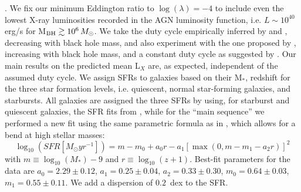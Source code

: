 . We fix our minimum Eddington ratio to $\log(\lambda)=-4$ to include even the lowest X-ray luminosities recorded in the AGN luminosity function, i.e. $L\sim 10^{40}\,$ erg/s for M$_{\rm BH}\gtrsim 10^6 \, M_{\odot}$. We take the duty cycle empirically inferred by \citet{2010A&A...516A..87S} and \citet{2015MNRAS.447.2085S}, decreasing with black hole mass, and also experiment with the one proposed by \citet{2019MNRAS.488...89M}, increasing with black hole mass, and a constant duty cycle as suggested by \citet{goulding10}. Our main results on the predicted mean L$_X$ are, as expected, independent of the assumed duty cycle. 
We assign SFRs to galaxies based on their M$_*$, redshift for the three star formation levels, i.e. quiescent, normal star-forming galaxies, and starbursts. All galaxies are assigned the three SFRs by using, for starburst and quiescent galaxies, the SFR fits from \citet[Table~3]{2020A&A...642A..65C}, while for the ``main sequence'' we performed a new fit using the same parametric formula as in \citet[Eq.~9]{2015A&A...575A..74S}, which allows for a bend at high stellar masses:
\begin{equation}
    \log_{10}(SFR[M_\odot yr^{-1}])= m - m_0 +a_0 r - a_1[\max(0,m-m_1-a_2r)]^2
	\label{eq:SFR}
\end{equation}
with $m\equiv\log_{10}(M_*)-9$ and $r\equiv\log_{10}(z+1)$. Best-fit parameters for the data are $a_0=2.29\pm 0.12$, $a_1=0.25 \pm 0.04$, $a_2=0.33 \pm 0.30$, $m_0=0.64 \pm 0.03$, $m_1=0.55\pm 0.11$. We add a dispersion of $0.2$~dex to the SFR. 

